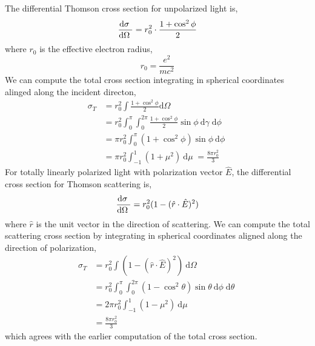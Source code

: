 \documentclass[12pt]{article}
\renewcommand{\d}[1]{\mathrm{d} #1 \;}
\begin{document}
The differential Thomson cross section for unpolarized light is,
\[ \deriv{\sigma}{\Omega} = r_0^2 \cdot \frac{1 + \cos^2{\phi}}{2} \]
where $r_0$ is the effective electron radius,
\[ r_0 = \frac{e^2}{mc^2} \]
We can compute the total cross section integrating in spherical coordinates alinged along the incident directon,
\begin{align*}
\sigma_T & = r_0^2  \int  \frac{1 + \cos^2{\phi}}{2} \d{\Omega}
\\
& = r_0^2 \int_0^{\pi} \int_0^{2 \pi} \frac{1 + \cos^2{\phi}}{2} \sin{\phi} \: \d{\gamma} \d{\phi}
\\
& = \pi r_0^2 \int_0^\pi (1 + \cos^2{\phi}) \sin{\phi} \: \d{\phi}
\\
& = \pi r_0^2 \int_{-1}^1 (1 + \mu^2) \: \d{\mu} = \frac{8 \pi r_0^2}{3}
\end{align*}
For totally linearly polarized light with polarization vector $\hat{E}$, the differential cross section for Thomson scattering is,
\[ \deriv{\sigma}{\Omega} = r_0^2 (1 - (\hat{r} \cdot \hat{E})^2) \]
where $\hat{r}$ is the unit vector in the direction of scattering. We can compute the total scattering cross section by integrating in spherical coordinates aligned along the direction of polarization,
\begin{align*}
\sigma_T & = r_0^2 \int (1 - (\hat{r} \cdot \hat{E})^2) \: \d{\Omega}
\\
& = r_0^2 \int_0^\pi \int_0^{2 \pi} (1 - \cos^2{\theta}) \sin{\theta} \: \d{\phi} \d{\theta}
\\
& = 2 \pi r_0^2 \int_{-1}^1 (1  - \mu^2) \: \d{\mu}
\\
& = \frac{8 \pi r_0^2}{3}
\end{align*}
which agrees with the earlier computation of the total cross section. 
\end{document}
